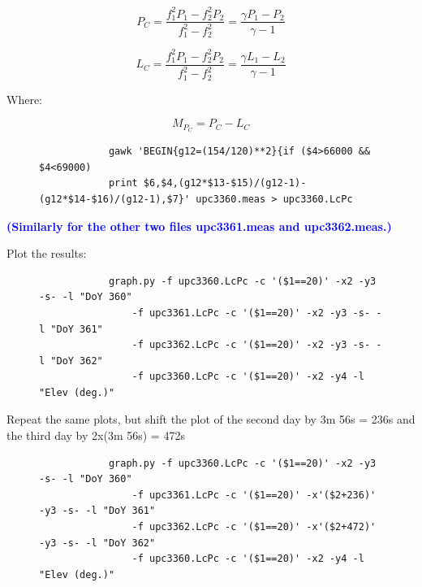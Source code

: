 \begin{equation}\label{Pcode_iono-free}
P_{C} = \frac{f_{1}^{2}P_{1}-f_{2}^{2}P_{2}}{f_{1}^{2}-f_{2}^{2}}
=
\frac{\gamma P_{1}-P_{2}}{\gamma - 1}
\end{equation}

\begin{equation}\label{Carrier_iono-free}
L_{C} = \frac{f_{1}^{2}P_{1}-f_{2}^{2}P_{2}}{f_{1}^{2}-f_{2}^{2}}
=
\frac{\gamma L_{1}-L_{2}}{\gamma - 1}
\end{equation}

Where:

\begin{equation}\label{Pcode_iono-free}
M_{P_{C}} = P_{C}-L_{C}
\end{equation}

\begin{figure}[H]
            \centering
            \begin{verbatim}
            gawk 'BEGIN{g12=(154/120)**2}{if ($4>66000 && $4<69000)
            print $6,$4,(g12*$13-$15)/(g12-1)-(g12*$14-$16)/(g12-1),$7}' upc3360.meas > upc3360.LcPc
            \end{verbatim}
            \caption{}
            \label{}
\end{figure}

\textbf{\textcolor{Blue}{(Similarly for the other two files upc3361.meas and upc3362.meas.)}}

Plot the results:
\begin{figure}[H]
            \centering
            \begin{verbatim}
            graph.py -f upc3360.LcPc -c '($1==20)' -x2 -y3 -s- -l "DoY 360"
                -f upc3361.LcPc -c '($1==20)' -x2 -y3 -s- -l "DoY 361"
                -f upc3362.LcPc -c '($1==20)' -x2 -y3 -s- -l "DoY 362"
                -f upc3360.LcPc -c '($1==20)' -x2 -y4 -l "Elev (deg.)"
            \end{verbatim}
            \caption{}
            \label{}
\end{figure}

Repeat the same plots, but shift the plot of the second day by 3m 56s = 236s and the third day by 2x(3m 56s) = 472s

\begin{figure}[H]
            \centering
            \begin{verbatim}
            graph.py -f upc3360.LcPc -c '($1==20)' -x2 -y3 -s- -l "DoY 360"
                -f upc3361.LcPc -c '($1==20)' -x'($2+236)' -y3 -s- -l "DoY 361"
                -f upc3362.LcPc -c '($1==20)' -x'($2+472)' -y3 -s- -l "DoY 362"
                -f upc3360.LcPc -c '($1==20)' -x2 -y4 -l "Elev (deg.)"
            \end{verbatim}
            \caption{}
            \label{}
\end{figure}



